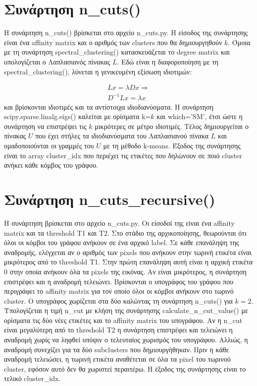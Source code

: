 \documentclass{article}
\begin{document}
\section{Συνάρτηση n\_cuts()}
Η συνάρτηση n\_cuts() βρίσκεται στο αρχείο n\_cuts.py. Η είσοδος της συνάρτησης 
είναι ένα affinity matrix και ο αριθμός των clusters που θα δημιουργηθούν $k$.
Όμοια με τη συνάρτηση spectral\_clustering() κατασκευάζεται το degree matrix 
και υπολογίζεται ο Λαπλασιανός πίνακας $L$. Εδώ είναι η διαφοροποίηση με τη
spectral\_clustering(), λύνεται η γενικευμένη εξίσωση ιδιοτιμών:

\begin{gather}
    Lx = \lambda Dx \Rightarrow \\
    D^{-1} Lx = \lambda x
\end{gather}
και βρίσκονται ιδιοτιμές και τα αντίστοιχα ιδιοδιανύσματα. Η συνάρτηση 
scipy.sparse.linalg.eigs() καλείται με ορίσματα k=$k$ και 
which='SM', έτσι ώστε η συνάρτηση να επιστρέψει τις $k$ μικρότερες σε μέτρο
ιδιοτιμές. Τέλος δημιουργείται ο πίνακας $U$
που έχει στήλες τα ιδιοδιανύσματα του Λαπλασιανού πίνακα $L$ και ομαδοποιούνται
οι γραμμές του $U$ με τη μέθοδο k-means. Έξοδος της συνάρτησης είναι το array 
cluster\_idx που περιέχει τις ετικέτες που δηλώνουν σε ποιό cluster ανήκει κάθε
κόμβος του γράφου.

\section{Συνάρτηση n\_cuts\_recursive()}
Η συνάρτηση βρίσκεται στο αρχείο n\_cuts.py. Οι είσοδοί της είναι ένα affinity matrix 
και τα threshold T1 και T2. Στο στάδιο της αρχικοποίησης, θεωρούνται ότι όλοι
οι κόμβοι του γράφου ανήκουν σε ένα αρχικό label. Σε κάθε επανάληψη της αναδρομής,
ελέγχεται αν ο αριθμός των pixels που ανήκουν στην τωρινή ετικέτα είναι μικρότερος
από το threshold T1. Στην πρώτη επανάληψη αυτή είναι η αρχική ετικέτα 0 στην οποία 
ανήκουν όλα τα pixels της εικόνας. Αν είναι μικρότερος, η συνάρτηση επιστρέφει 
και η αναδρομή τελειώνει. Βρίσκονται ο υπογράφος του γράφου που περιγράφει το
affinity matrix για τον οποίο όλοι οι κόμβοι ανήκουν στο τωρινό cluster. Ο
υπογράφος χωρίζεται στα δύο καλώντας τη συνάρτηση n\_cuts() για $k=2$. 
Υπολογίζεται η τιμή n\_cut με κλήση της συνάρτησης calculate\_n\_cut\_value()
με ορίσματα τις δύο νέες ετικέτες και το affinity matrix του υπογράφου.
Αν η n\_cut είναι μεγαλύτερη από το threshold T2 η συνάρτηση επιστρέφει και τελειώνει η
αναδρομή χωρίς να ληφθεί υπόψιν ο τελευταίος χωρισμός του υπογράφου. Αλλιώς,
η αναδρομή συνεχίζει για τα δύο subclusters που δημιουργήθηκαν. Πριν η 
κάθε αναδρομή τελειώσει, η τωρινή ετικέτα αναθέτεται σε όλα τα pixel
του τωρινού cluster, εφόσον αυτό δεν θα χωριστεί περαιτέρω. Η έξοδος της
συνάρτησης είναι το τελικό cluster\_idx.
\end{document}
